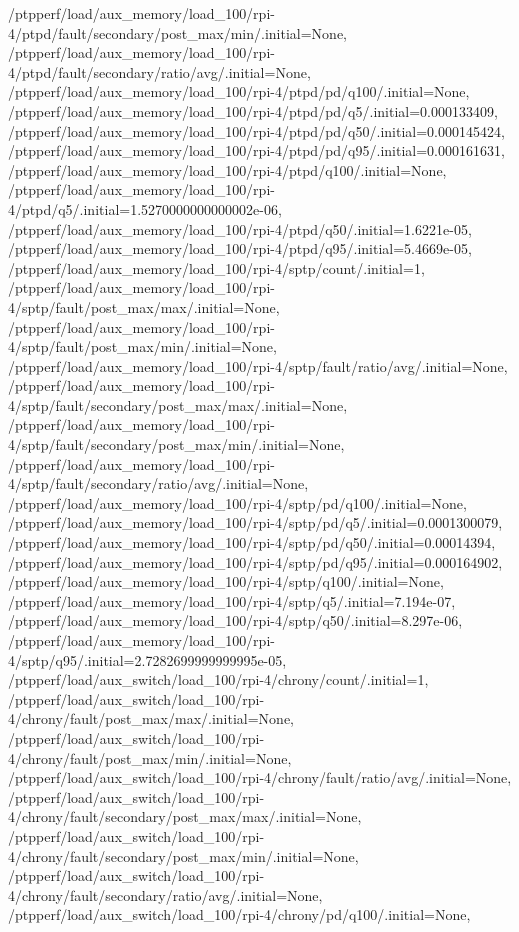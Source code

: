 {    /ptpperf/load/aux_memory/load_100/rpi-4/ptpd/fault/secondary/post_max/min/.initial=None,
    /ptpperf/load/aux_memory/load_100/rpi-4/ptpd/fault/secondary/ratio/avg/.initial=None,
    /ptpperf/load/aux_memory/load_100/rpi-4/ptpd/pd/q100/.initial=None,
    /ptpperf/load/aux_memory/load_100/rpi-4/ptpd/pd/q5/.initial=0.000133409,
    /ptpperf/load/aux_memory/load_100/rpi-4/ptpd/pd/q50/.initial=0.000145424,
    /ptpperf/load/aux_memory/load_100/rpi-4/ptpd/pd/q95/.initial=0.000161631,
    /ptpperf/load/aux_memory/load_100/rpi-4/ptpd/q100/.initial=None,
    /ptpperf/load/aux_memory/load_100/rpi-4/ptpd/q5/.initial=1.5270000000000002e-06,
    /ptpperf/load/aux_memory/load_100/rpi-4/ptpd/q50/.initial=1.6221e-05,
    /ptpperf/load/aux_memory/load_100/rpi-4/ptpd/q95/.initial=5.4669e-05,
    /ptpperf/load/aux_memory/load_100/rpi-4/sptp/count/.initial=1,
    /ptpperf/load/aux_memory/load_100/rpi-4/sptp/fault/post_max/max/.initial=None,
    /ptpperf/load/aux_memory/load_100/rpi-4/sptp/fault/post_max/min/.initial=None,
    /ptpperf/load/aux_memory/load_100/rpi-4/sptp/fault/ratio/avg/.initial=None,
    /ptpperf/load/aux_memory/load_100/rpi-4/sptp/fault/secondary/post_max/max/.initial=None,
    /ptpperf/load/aux_memory/load_100/rpi-4/sptp/fault/secondary/post_max/min/.initial=None,
    /ptpperf/load/aux_memory/load_100/rpi-4/sptp/fault/secondary/ratio/avg/.initial=None,
    /ptpperf/load/aux_memory/load_100/rpi-4/sptp/pd/q100/.initial=None,
    /ptpperf/load/aux_memory/load_100/rpi-4/sptp/pd/q5/.initial=0.0001300079,
    /ptpperf/load/aux_memory/load_100/rpi-4/sptp/pd/q50/.initial=0.00014394,
    /ptpperf/load/aux_memory/load_100/rpi-4/sptp/pd/q95/.initial=0.000164902,
    /ptpperf/load/aux_memory/load_100/rpi-4/sptp/q100/.initial=None,
    /ptpperf/load/aux_memory/load_100/rpi-4/sptp/q5/.initial=7.194e-07,
    /ptpperf/load/aux_memory/load_100/rpi-4/sptp/q50/.initial=8.297e-06,
    /ptpperf/load/aux_memory/load_100/rpi-4/sptp/q95/.initial=2.7282699999999995e-05,
    /ptpperf/load/aux_switch/load_100/rpi-4/chrony/count/.initial=1,
    /ptpperf/load/aux_switch/load_100/rpi-4/chrony/fault/post_max/max/.initial=None,
    /ptpperf/load/aux_switch/load_100/rpi-4/chrony/fault/post_max/min/.initial=None,
    /ptpperf/load/aux_switch/load_100/rpi-4/chrony/fault/ratio/avg/.initial=None,
    /ptpperf/load/aux_switch/load_100/rpi-4/chrony/fault/secondary/post_max/max/.initial=None,
    /ptpperf/load/aux_switch/load_100/rpi-4/chrony/fault/secondary/post_max/min/.initial=None,
    /ptpperf/load/aux_switch/load_100/rpi-4/chrony/fault/secondary/ratio/avg/.initial=None,
    /ptpperf/load/aux_switch/load_100/rpi-4/chrony/pd/q100/.initial=None,
}
